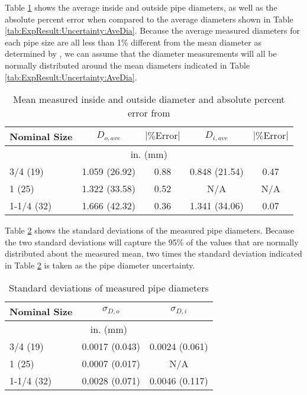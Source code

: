 Table \ref{tab:ExpResult:Uncertainty:AveDiaMeas} shows the average inside and outside pipe diameters, as well as the absolute percent error when compared to the average diameters shown in Table \ref{tab:ExpResult:Uncertainty:AveDia}. Because the average measured diameters for each pipe size are all less than 1\% different from the mean diameter as determined by \cite{ASTMD3035}, we can assume that the diameter measurements will all be normally distributed around the mean diameters indicated in Table \ref{tab:ExpResult:Uncertainty:AveDia}.

\begin{table}[h]
	\centering
	\caption{Mean measured inside and outside diameter and absolute percent error from \cite{ASTMD3035}}
	\label{tab:ExpResult:Uncertainty:AveDiaMeas}
	\begin{tabular}{l | c c | c c}
	\hline
	Nominal Size & $D_{o,ave}$ & $|\mbox{\% Error}|$ & $D_{i,ave}$ & $|\mbox{\% Error}|$ \\
	\hline
	\multicolumn{5}{c}{in. (mm)} \\
	\hline\hline
	3/4 (19) & 1.059 (26.92) & 0.88 & 0.848 (21.54) & 0.47 \\
	\hline
	1 (25) & 1.322 (33.58) & 0.52 & N/A & N/A \\
	\hline
	1-1/4 (32) & 1.666 (42.32) & 0.36 & 1.341 (34.06) & 0.07 \\
	\hline	
	\end{tabular}
\end{table}

Table \ref{tab:ExpResult:Uncertainty:STDEVs} shows the standard deviations of the measured pipe diameters. Because the two standard deviations will capture the 95\% of the values that are normally distributed about the measured mean, two times the standard deviation indicated in Table \ref{tab:ExpResult:Uncertainty:STDEVs} is taken as the pipe diameter uncertainty.

\begin{table}[h]
	\centering
	\caption{Standard deviations of measured pipe diameters}
	\label{tab:ExpResult:Uncertainty:STDEVs}
	\begin{tabular}{l | c c}
	\hline
	Nominal Size & $\sigma_{D,o}$ & $\sigma_{D,i}$ \\
	\hline
	\multicolumn{3}{c}{in. (mm)} \\
	\hline\hline
	3/4 (19) & 0.0017 (0.043) & 0.0024 (0.061) \\
	\hline
	1 (25) & 0.0007 (0.017) & N/A \\
	\hline
	1-1/4 (32) & 0.0028 (0.071) & 0.0046 (0.117) \\
	\hline	
	\end{tabular}
\end{table}

